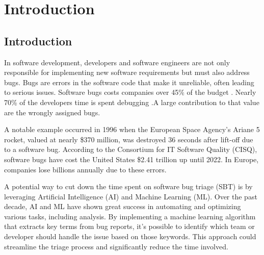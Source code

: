 
%

\chapter{Introduction}
\label{cha:introduction}


\section{Introduction}
\label{sec:if_you_use_this_template}

In software development, developers and software engineers are not only responsible for implementing new software requirements but must also address bugs. Bugs are errors in the software code that make it unreliable, often leading to serious issues. Software bugs costs companies over 45\% of the budget \cite{Xuan2015}. Nearly 70\% of the developers time is spent debugging \cite{Minelli2015}.A large contribution to that value are the wrongly assigned bugs.

 A notable example occurred in 1996 when the European Space Agency's Ariane 5 rocket, valued at nearly \$370 million, was destroyed 36 seconds after lift-off due to a software bug. According to the Consortium for IT Software Quality (CISQ), software bugs have cost the United States \$2.41 trillion up until 2022. In Europe, companies lose billions annually due to these errors. 

A potential way to cut down the time spent on software bug triage (SBT) is by leveraging Artificial Intelligence (AI) and Machine Learning (ML). Over the past decade, AI and ML have shown great success in automating and optimizing various tasks, including analysis. By implementing a machine learning algorithm that extracts key terms from bug reports, it's possible to identify which team or developer should handle the issue based on those keywords. This approach could streamline the triage process and significantly reduce the time involved.



